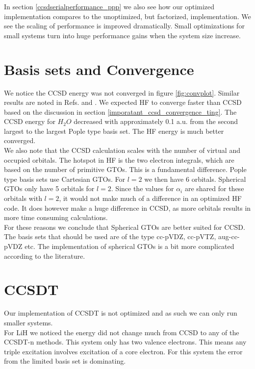 \documentclass[a4paper,norsk,11pt,twoside]{report}
\begin{document}
In section \ref{ccsdserialperformance_ppp} we also see how our optimized implementation compares to the unoptimized, but factorized, implementation. We see the scaling of performance is improved dramatically. Small optimizations for small systems turn into huge performance gains when the system size increase.

\section{Basis sets and Convergence}
We notice the CCSD energy was not converged in figure \ref{fig:convplot}. Similar results are noted in Refs.\cite{basis_set_convergence_important_citation} and \cite{hmeiding}. We expected HF to converge faster than CCSD based on the discussion in section \ref{imporatant_ccsd_convergence_ting}. The CCSD energy for $H_2O$ decreased with approximately 0.1 a.u. from the second largest to the largest Pople type basis set. The HF energy is much better converged. \\

We also note that the CCSD calculation scales with the number of virtual and occupied orbitals. The hotspot in HF is the two electron integrals, which are based on the number of primitive GTOs. This is a fundamental difference. Pople type basis sets use Cartesian GTOs. For $l = 2$ we then have 6 orbitals. Spherical GTOs only have 5 orbitals for $l = 2$. Since the values for $\alpha_i$ are shared for these orbitals with $l = 2$, it would not make much of a difference in an optimized HF code. It does however make a huge difference in CCSD, as more orbitals results in more time consuming calculations. \\

For these reasons we conclude that Spherical GTOs are better suited for CCSD. The basis sets that should be used are of the type cc-pVDZ, cc-pVTZ, aug-cc-pVDZ etc. The implementation of spherical GTOs is a bit more complicated according to the literature.

\section{CCSDT}
Our implementation of CCSDT is not optimized and as such we can only run smaller systems. \\

For LiH we noticed the energy did not change much from CCSD to any of the CCSDT-n methods. This system only has two valence electrons. This means any triple excitation involves excitation of a core electron. For this system the error from the limited basis set is dominating. \\
\end{document}
